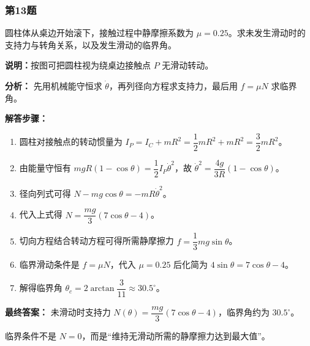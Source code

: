 \documentclass[12pt,a4paper]{ctexart}
\begin{document}
\subsubsection*{第13题}
\begin{tcolorbox}[colback=gray!2!white,colframe=black!60,title={题目}]
圆柱体从桌边开始滚下，接触过程中静摩擦系数为 \(\mu=0.25\)。求未发生滑动时的支持力与转角关系，以及发生滑动的临界角。\par
\vspace{0.4em}
\textbf{说明：}按图可把圆柱视为绕桌边接触点 \(P\) 无滑动转动。\par
\end{tcolorbox}
\begin{tcolorbox}[colback=blue!2!white,colframe=blue!55!black,title={完整答案}]
\textbf{分析：}
先用机械能守恒求 \(\dot\theta\)，再列径向方程求支持力，最后用 \(f=\mu N\) 求临界角。\par
\textbf{解答步骤：}
\begin{enumerate}
\item 圆柱对接触点的转动惯量为 \(I_P=I_C+mR^2=\dfrac12 mR^2+mR^2=\dfrac32 mR^2\)。
\item 由能量守恒有 \(mgR(1-\cos\theta)=\dfrac12 I_P\dot\theta^2\)，故 \(\dot\theta^2=\dfrac{4g}{3R}(1-\cos\theta)\)。
\item 径向列式可得 \(N-mg\cos\theta=-mR\dot\theta^2\)。
\item 代入上式得 \(N=\dfrac{mg}{3}(7\cos\theta-4)\)。
\item 切向方程结合转动方程可得所需静摩擦力 \(f=\dfrac13 mg\sin\theta\)。
\item 临界滑动条件是 \(f=\mu N\)，代入 \(\mu=0.25\) 后化简为 \(4\sin\theta=7\cos\theta-4\)。
\item 解得临界角 \(\theta_c=2\arctan\dfrac{3}{11}\approx 30.5^\circ\)。
\end{enumerate}
\textbf{最终答案：}
未滑动时支持力 \(N(\theta)=\dfrac{mg}{3}(7\cos\theta-4)\)，临界角约为 \(30.5^\circ\)。\par
\end{tcolorbox}
\begin{tcolorbox}[colback=red!2!white,colframe=red!55!black,title={易错点}]
临界条件不是 \(N=0\)，而是“维持无滑动所需的静摩擦力达到最大值”。\par
\end{tcolorbox}
\end{document}

